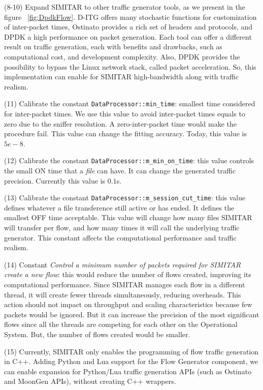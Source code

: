 (8-10) Expand SIMITAR to other traffic generator tools, as we present in the figure ~\ref{fig:DpdkFlow}. D-ITG offers many stochastic functions for customization of inter-packet times, Ostinato provides a rich set of headers and protocols, and DPDK a high performance on packet generation. Each tool can offer a different result on traffic generation, each with benefits and drawbacks, such as computational cost, and development complexity.  Also, DPDK provides the possibility to bypass the Linux network stack, called packet acceleration. So, this implementation can enable for SIMITAR high-bandwidth along with traffic realism.


(11) Calibrate  the constant  \texttt{DataProcessor::min\_time}: smallest time considered for inter-packet times. We use this value to avoid inter-packet times equals to zero due to the sniffer resolution. A zero-inter-packet time would make the procedure fail.  This value can change the fitting accuracy. Today, this value is $5e-8$.


(12) Calibrate  the constant \texttt{DataProcessor::m\_min\_on\_time}: this value controls the small ON time that a \textit{file} can have. It can change the generated traffic precision. Currently this value is $0.1$s. 


(13) Calibrate  the constant \texttt{DataProcessor::m\_session\_cut\_time}: this value defines whatever a file transference still active or has ended. It defines the smallest OFF time acceptable. This value will change how many files SIMITAR will transfer per flow, and how many times it will call the underlying traffic generator. This constant affects the computational performance and traffic realism.


(14) Constant \textit{Control a minimum number of packets required for SIMITAR create a new flow}: this would reduce the number of flows created, improving its computational performance. Since SIMITAR manages each flow in a different thread, it will create fewer threads simultaneously, reducing overheads. This action should not impact on throughput and scaling characteristics because few packets would be ignored. But it can increase the precision of the most significant flows since all the threads are competing for each other on the Operational System. But, the number of flows created would be smaller.


(15) Currently, SIMITAR only enables the programming of flow traffic generation in C++. Adding Python and Lua support for the Flow Generator component, we can enable expansion for Python/Lua traffic generation APIs (such as Ostinato and MoonGen APIs), without creating C++ wrappers.


